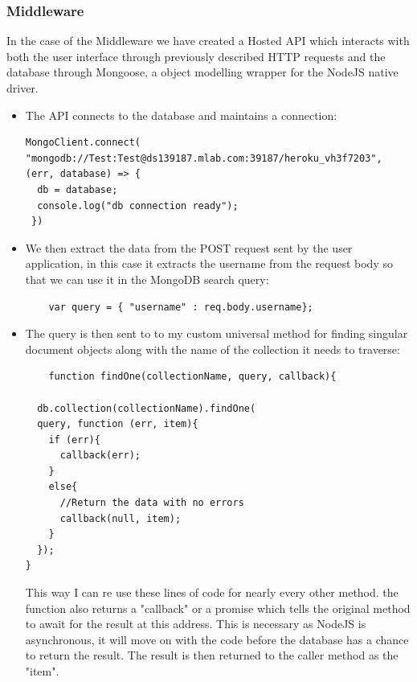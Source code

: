 \subsubsection{Middleware}
    In the case of the Middleware we have created a Hosted API which interacts with both the user interface through previously described HTTP requests and the database through Mongoose, a object modelling wrapper for the NodeJS native driver. \cite{mongoose}
\begin{itemize}


    \item The API connects to the database and maintains a connection:
\begin{verbatim}
MongoClient.connect(
"mongodb://Test:Test@ds139187.mlab.com:39187/heroku_vh3f7203",
(err, database) => {
  db = database;
  console.log("db connection ready");
 })
\end{verbatim}
    \item We then extract the data from the POST request sent by the user application, in this case it extracts the username from the request body so that we can use it in the MongoDB search query:
\begin{verbatim}
    var query = { "username" : req.body.username};
\end{verbatim}
    \item The query is then sent to to my custom universal method for finding singular document objects along with the name of the collection it needs to traverse:
\begin{verbatim}
    function findOne(collectionName, query, callback){

  db.collection(collectionName).findOne(
  query, function (err, item){
    if (err){
      callback(err);
    }
    else{
      //Return the data with no errors
      callback(null, item);
    }
  });
}
\end{verbatim}
    This way I can re use these lines of code for nearly every other method. the function also returns a "callback" or a promise which tells the original method to await for the result at this address. This is necessary as NodeJS is asynchronous, it will move on with the code before the database has a chance to return the result.
    The result is then returned to the caller method as the "item".


\end{itemize}
